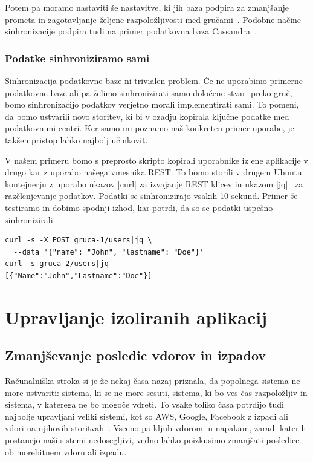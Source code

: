 \documentclass[a4paper, 12pt]{book}
\begin{document}
Potem pa moramo nastaviti še nastavitve, ki jih baza podpira za zmanj\-šan\-je prometa in zagotavljanje željene razpoložljivosti med gručami~\cite{cratedb-zone}.
Podobne načine sinhronizacije podpira tudi na primer podatkovna baza Cassandra~\cite{cassandra-zone}.
\subsection{Podatke sinhroniziramo sami}
Sinhronizacija podatkovne baze ni trivialen problem.
Če ne uporabimo primerne podatkovne baze ali pa želimo sinhronizirati samo določene stvari preko gruč, bomo sinhronizacijo podatkov verjetno morali implementirati sami.
To pomeni, da bomo ustvarili novo storitev, ki bi v ozadju kopirala ključne podatke med podatkovnimi centri.
Ker samo mi poznamo naš konkreten primer uporabe, je takšen pristop lahko najbolj učinkovit.

V našem primeru bomo s preprosto skripto kopirali uporabnike iz ene aplikacije v drugo kar z uporabo našega vmesnika REST.
To bomo storili v drugem Ubuntu kontejnerju z uporabo ukazov \spverb|curl| za izvajanje REST klicev in ukazom \spverb|jq|~\cite{jq} za razčlenjevanje podatkov.
Podatki se sinhronizirajo vsakih 10 sekund.
Primer še testiramo in dobimo spodnji izhod, kar potrdi, da so se podatki uspešno sinhronizirali.
\begin{verbatim}
curl -s -X POST gruca-1/users|jq \
  --data '{"name": "John", "lastname": "Doe"}'
curl -s gruca-2/users|jq
[{"Name":"John","Lastname":"Doe"}]
\end{verbatim}
\chapter{Upravljanje izoliranih aplikacij}
\section{Zmanjševanje posledic vdorov in izpadov}
Računalniška stroka si je že nekaj časa nazaj priznala, da popolnega sistema ne more ustvariti: sistema, ki se ne more sesuti, sistema, ki bo ves čas razpoložljiv in sistema, v katerega ne bo mogoče vdreti.
To vsake toliko časa potrdijo tudi najbolje upravljani veliki sistemi, kot so AWS, Google, Facebook z izpadi ali vdori na njihovih storitvah~\cite{common-outages}. 
Vseeno pa kljub vdorom in napakam, zaradi katerih postanejo naši sistemi nedosegljivi, vedno lahko poizkusimo zmanjšati posledice ob morebitnem vdoru ali izpadu. 
\end{document}
